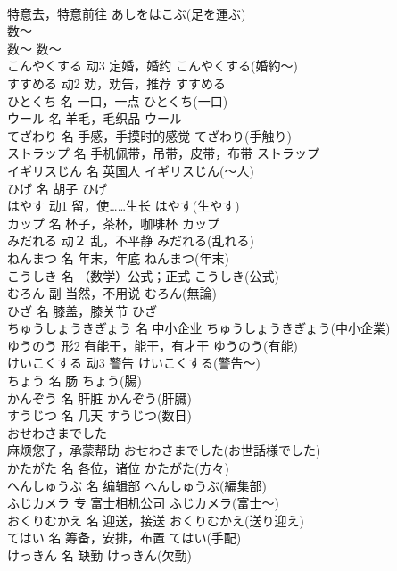 \documentclass[8pt]{extreport}
\begin{document}
\begin{CJK}{UTF8}{min}
\\	特意去，特意前往	あしをはこぶ(足を運ぶ)	
\\	数～	
\\	数～	数～	
\\	こんやくする	动3	定婚，婚约	こんやくする(婚約～)	
\\	すすめる	动2	劝，劝告，推荐	すすめる	
\\	ひとくち	名	一口，一点	ひとくち(一口)	
\\	ウール	名	羊毛，毛织品	ウール	
\\	てざわり	名	手感，手摸时的感觉	てざわり(手触り)	
\\	ストラップ	名	手机佩带，吊带，皮带，布带	ストラップ	
\\	イギリスじん	名	英国人	イギリスじん(～人)	
\\	ひげ	名	胡子	ひげ	
\\	はやす	动1	留，使……生长	はやす(生やす)	
\\	カップ	名	杯子，茶杯，咖啡杯	カップ	
\\	みだれる	动２	乱，不平静	みだれる(乱れる)	
\\	ねんまつ	名	年末，年底	ねんまつ(年末)	
\\	こうしき	名	（数学）公式；正式	こうしき(公式)	
\\	むろん	副	当然，不用说	むろん(無論)	
\\	ひざ	名	膝盖，膝关节	ひざ	
\\	ちゅうしょうきぎょう	名	中小企业	ちゅうしょうきぎょう(中小企業)	
\\	ゆうのう	形2	有能干，能干，有才干	ゆうのう(有能)	
\\	けいこくする	动3	警告	けいこくする(警告～)	
\\	ちょう	名	肠	ちょう(腸)	
\\	かんぞう	名	肝脏	かんぞう(肝臓)	
\\	すうじつ	名	几天	すうじつ(数日)	
\\	おせわさまでした	
\\	麻烦您了，承蒙帮助	おせわさまでした(お世話様でした)	
\\	かたがた	名	各位，诸位	かたがた(方々)	
\\	へんしゅうぶ	名	编辑部	へんしゅうぶ(編集部)	
\\	ふじカメラ	专	富士相机公司	ふじカメラ(富士～)	
\\	おくりむかえ	名	迎送，接送	おくりむかえ(送り迎え)	
\\	てはい	名	筹备，安排，布置	てはい(手配)	
\\	けっきん	名	缺勤	けっきん(欠勤)	

\end{CJK}
\end{document}
